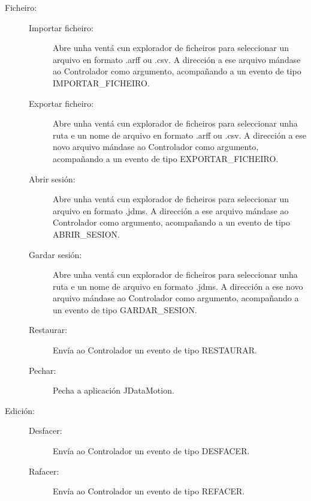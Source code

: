 \begin{description}

\item[Ficheiro:] \hfill

\begin{description}

\item[Importar ficheiro:] \hfill
Abre unha ventá cun explorador de ficheiros para seleccionar un arquivo en formato .arff ou .csv. A dirección a ese arquivo mándase ao Controlador como argumento, acompañando a un evento de tipo IMPORTAR\_FICHEIRO.

\item[Exportar ficheiro:] \hfill
Abre unha ventá cun explorador de ficheiros para seleccionar unha ruta e un nome de arquivo en formato .arff ou .csv. A dirección a ese novo arquivo mándase ao Controlador como argumento, acompañando a un evento de tipo EXPORTAR\_FICHEIRO.

\item[Abrir sesión:] \hfill
Abre unha ventá cun explorador de ficheiros para seleccionar un arquivo en formato .jdms. A dirección a ese arquivo mándase ao Controlador como argumento, acompañando a un evento de tipo ABRIR\_SESION.

\item[Gardar sesión:] \hfill
Abre unha ventá cun explorador de ficheiros para seleccionar unha ruta e un nome de arquivo en formato .jdms. A dirección a ese novo arquivo mándase ao Controlador como argumento, acompañando a un evento de tipo GARDAR\_SESION.

\item[Restaurar:] \hfill
Envía ao Controlador un evento de tipo RESTAURAR.

\item[Pechar:] \hfill
Pecha a aplicación JDataMotion.

\end{description}

\item[Edición:] \hfill

\begin{description}

\item[Desfacer:] \hfill
Envía ao Controlador un evento de tipo DESFACER.

\item[Rafacer:] \hfill
Envía ao Controlador un evento de tipo REFACER.

\end{description}


\end{description}
